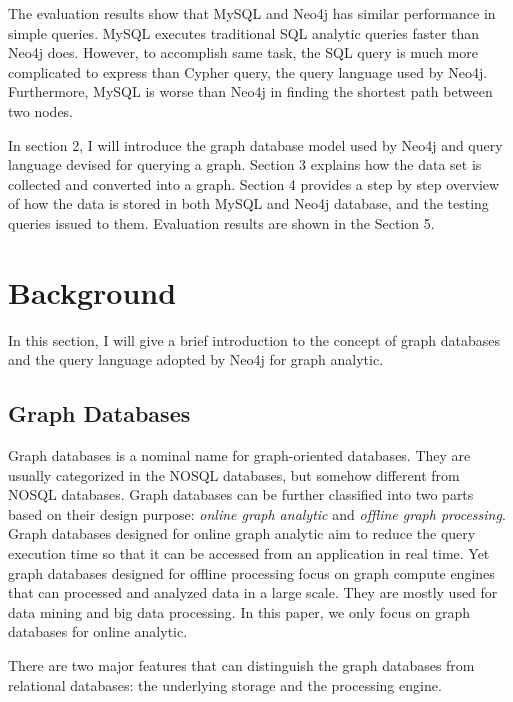 \documentclass[letterpaper,twocolumn,11pt]{article}
\begin{document}
The evaluation results show that MySQL and Neo4j has similar performance in simple queries. MySQL executes traditional SQL analytic queries faster than Neo4j does. However, to accomplish same task, the SQL query is much more complicated to express than Cypher query, the query language used by Neo4j. Furthermore, MySQL is worse than Neo4j in finding the shortest path between two nodes.

In section 2, I will introduce the graph database model used by Neo4j and query language devised for querying a graph. Section 3 explains how the data set is collected and converted into a graph. Section 4 provides a step by step overview of how the data is stored in both MySQL and Neo4j database, and the testing queries issued to them. Evaluation results are shown in the Section 5.

\section{Background}
\label{sec:background}
In this section, I will give a brief introduction to the concept of graph databases and the query language adopted by Neo4j for graph analytic. 

\subsection{Graph Databases}
Graph databases is a nominal name for graph-oriented databases. They are usually categorized in the NOSQL databases, but somehow different from NOSQL databases. Graph databases can be further classified into two parts based on their design purpose: {\it online graph analytic} and {\it offline graph processing}. Graph databases designed for online graph analytic aim to reduce the query execution time so that it can be accessed from an application in real time. Yet graph databases designed for offline processing focus on graph compute engines that can processed and analyzed data in a large scale. They are mostly used for data mining and big data processing. In this paper, we only focus on graph databases for online analytic.

There are two major features that can distinguish the graph databases from relational databases: the underlying storage and the processing engine.
\end{document}
